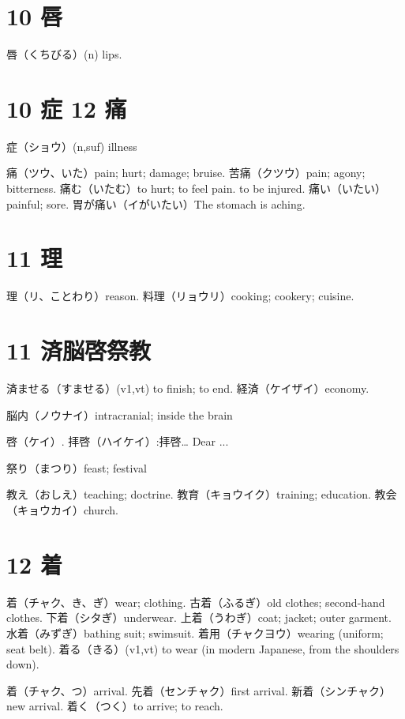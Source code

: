 \section{10 唇}

唇（くちびる）(n) lips.

\section{10 症 12 痛}

症（ショウ）(n,suf) illness

痛（ツウ、いた）pain; hurt; damage; bruise.
苦痛（クツウ）pain; agony; bitterness.
痛む（いたむ）to hurt; to feel pain. to be injured.
痛い（いたい）painful; sore.
胃が痛い（イがいたい）The stomach is aching.

\section{11 理}

理（リ、ことわり）reason.
料理（リョウリ）cooking; cookery; cuisine.

\section{11 済脳啓祭教}

済ませる（すませる）(v1,vt) to finish; to end.
経済（ケイザイ）economy.

脳内（ノウナイ）intracranial; inside the brain

啓（ケイ）.
拝啓（ハイケイ）:拝啓… Dear ...

祭り（まつり）feast; festival

教え（おしえ）teaching; doctrine.
教育（キョウイク）training; education.
教会（キョウカイ）church.

\section{12 着}

着（チャク、き、ぎ）wear; clothing.
古着（ふるぎ）old clothes; second-hand clothes.
下着（シタぎ）underwear.
上着（うわぎ）coat; jacket; outer garment.
水着（みずぎ）bathing suit; swimsuit.
着用（チャクヨウ）wearing (uniform; seat belt).
着る（きる）(v1,vt) to wear (in modern Japanese, from the shoulders down).

着（チャク、つ）arrival.
先着（センチャク）first arrival.
新着（シンチャク）new arrival.
着く（つく）to arrive; to reach.

